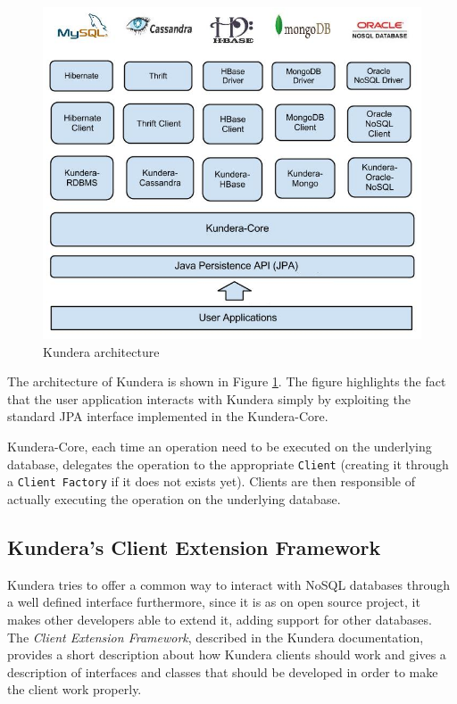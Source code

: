 \begin{figure}[tbh]
  \centering
  \includegraphics[scale=0.5]{images/kundera_architecture}
  \caption{Kundera architecture \cite{online:kundera}}
  \label{fig:kundera_architecture}
\end{figure}

\noindent The architecture of Kundera is shown in Figure \ref{fig:kundera_architecture}. The figure highlights the fact that the user application interacts with Kundera simply by exploiting the standard JPA interface implemented in the Kundera-Core.

\noindent Kundera-Core, each time an operation need to be executed on the underlying database, delegates the operation to the appropriate \texttt{Client} (creating it through a \texttt{Client Factory} if it does not exists yet). Clients are then responsible of actually executing the operation on the underlying database.

\subsection{Kundera's Client Extension Framework}
Kundera tries to offer a common way to interact with NoSQL databases through a well defined interface furthermore, since it is as on open source project, it makes other developers able to extend it, adding support for other databases.
The \textit{Client Extension Framework}, described in the Kundera documentation, provides a short description about how Kundera clients should work and gives a description of interfaces and classes that should be developed in order to make the client work properly.

